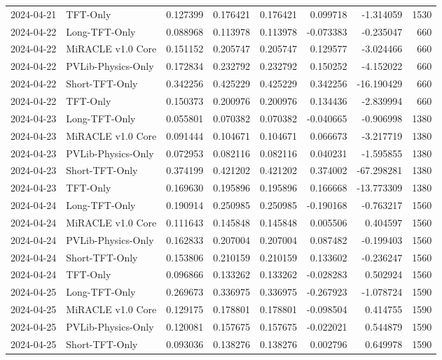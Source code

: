 \begin{tabular}{llrrrrrr}
2024-04-21 & TFT-Only & 0.127399 & 0.176421 & 0.176421 & 0.099718 & -1.314059 & 1530 \\
2024-04-22 & Long-TFT-Only & 0.088968 & 0.113978 & 0.113978 & -0.073383 & -0.235047 & 660 \\
2024-04-22 & MiRACLE v1.0 Core & 0.151152 & 0.205747 & 0.205747 & 0.129577 & -3.024466 & 660 \\
2024-04-22 & PVLib-Physics-Only & 0.172834 & 0.232792 & 0.232792 & 0.150252 & -4.152022 & 660 \\
2024-04-22 & Short-TFT-Only & 0.342256 & 0.425229 & 0.425229 & 0.342256 & -16.190429 & 660 \\
2024-04-22 & TFT-Only & 0.150373 & 0.200976 & 0.200976 & 0.134436 & -2.839994 & 660 \\
2024-04-23 & Long-TFT-Only & 0.055801 & 0.070382 & 0.070382 & -0.040665 & -0.906998 & 1380 \\
2024-04-23 & MiRACLE v1.0 Core & 0.091444 & 0.104671 & 0.104671 & 0.066673 & -3.217719 & 1380 \\
2024-04-23 & PVLib-Physics-Only & 0.072953 & 0.082116 & 0.082116 & 0.040231 & -1.595855 & 1380 \\
2024-04-23 & Short-TFT-Only & 0.374199 & 0.421202 & 0.421202 & 0.374002 & -67.298281 & 1380 \\
2024-04-23 & TFT-Only & 0.169630 & 0.195896 & 0.195896 & 0.166668 & -13.773309 & 1380 \\
2024-04-24 & Long-TFT-Only & 0.190914 & 0.250985 & 0.250985 & -0.190168 & -0.763217 & 1560 \\
2024-04-24 & MiRACLE v1.0 Core & 0.111643 & 0.145848 & 0.145848 & 0.005506 & 0.404597 & 1560 \\
2024-04-24 & PVLib-Physics-Only & 0.162833 & 0.207004 & 0.207004 & 0.087482 & -0.199403 & 1560 \\
2024-04-24 & Short-TFT-Only & 0.153806 & 0.210159 & 0.210159 & 0.133602 & -0.236247 & 1560 \\
2024-04-24 & TFT-Only & 0.096866 & 0.133262 & 0.133262 & -0.028283 & 0.502924 & 1560 \\
2024-04-25 & Long-TFT-Only & 0.269673 & 0.336975 & 0.336975 & -0.267923 & -1.078724 & 1590 \\
2024-04-25 & MiRACLE v1.0 Core & 0.129175 & 0.178801 & 0.178801 & -0.098504 & 0.414755 & 1590 \\
2024-04-25 & PVLib-Physics-Only & 0.120081 & 0.157675 & 0.157675 & -0.022021 & 0.544879 & 1590 \\
2024-04-25 & Short-TFT-Only & 0.093036 & 0.138276 & 0.138276 & 0.002796 & 0.649978 & 1590 \\

\end{tabular}
